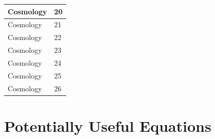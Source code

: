 \documentclass{book}
\begin{document}
\begin{table}[H]
\begin{tabular}{|ll|}
        Cosmology                       & 20      \\ \hline
        Cosmology                       & 21      \\ \hline
        Cosmology                       & 22      \\ \hline
        Cosmology                       & 23      \\ \hline
        Cosmology                       & 24      \\ \hline
        Cosmology                       & 25      \\ \hline
        Cosmology                       & 26      \\ \hline
    \end{tabular}
\end{table}

\chapter{Potentially Useful Equations}
\end{document}
